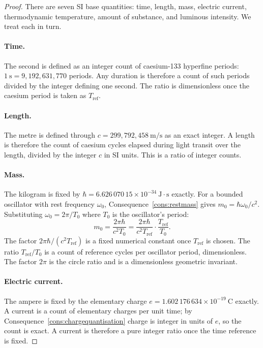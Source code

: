 \documentclass[11pt,twocolumn,a4paper]{article}
\theoremstyle{axiomstyle}
\theoremstyle{conseqstyle}
\theoremstyle{definition}
\theoremstyle{remark}
\begin{document}
\begin{proof}
There are seven SI base quantities: time, length, mass, electric current, thermodynamic temperature, amount of substance, and luminous intensity. We treat each in turn.

\paragraph{Time.} The second is defined as an integer count of caesium-133 hyperfine periods: $1~\mathrm{s}=9{,}192{,}631{,}770$ periods. Any duration is therefore a count of such periods divided by the integer defining one second. The ratio is dimensionless once the caesium period is taken as $T_{\mathrm{ref}}$.

\paragraph{Length.} The metre is defined through $c=299{,}792{,}458~\mathrm{m/s}$ as an exact integer. A length is therefore the count of caesium cycles elapsed during light transit over the length, divided by the integer $c$ in SI units. This is a ratio of integer counts.

\paragraph{Mass.} The kilogram is fixed by $\hbar=6.626\,070\,15\times10^{-34}~\mathrm{J\cdot s}$ exactly. For a bounded oscillator with rest frequency $\omega_{0}$, Consequence~\ref{cons:restmass} gives $m_{0}=\hbar\omega_{0}/c^{2}$. Substituting $\omega_{0}=2\pi/T_{0}$ where $T_{0}$ is the oscillator's period:
\begin{equation}
m_{0}=\frac{2\pi\hbar}{c^{2}T_{0}}=\frac{2\pi\hbar}{c^{2}T_{\mathrm{ref}}}\cdot\frac{T_{\mathrm{ref}}}{T_{0}}.
\end{equation}
The factor $2\pi\hbar/(c^{2}T_{\mathrm{ref}})$ is a fixed numerical constant once $T_{\mathrm{ref}}$ is chosen. The ratio $T_{\mathrm{ref}}/T_{0}$ is a count of reference cycles per oscillator period, dimensionless. The factor $2\pi$ is the circle ratio and is a dimensionless geometric invariant.

\paragraph{Electric current.} The ampere is fixed by the elementary charge $e=1.602\,176\,634\times10^{-19}~\mathrm{C}$ exactly. A current is a count of elementary charges per unit time; by Consequence~\ref{cons:chargequantisation} charge is integer in units of $e$, so the count is exact. A current is therefore a pure integer ratio once the time reference is fixed.


\end{proof}
\end{document}
